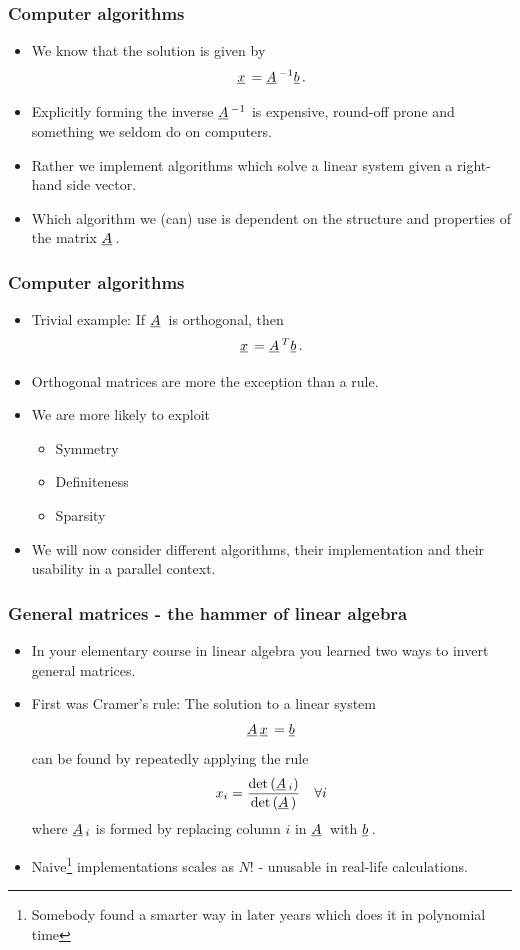 \documentclass{beamer}
\newcommand{\ub}[1]{\underbar{$#1$}\,}
\begin{document}
\begin{frame}\frametitle{Computer algorithms}
  \begin{itemize}
    \item We know that the solution is given by
      \[
        \ub{x} = \ub{A}^{-1}\ub{b}.
      \]
    \item Explicitly forming the inverse $\ub{A}^{-1}$ is expensive, round-off prone
        and something we seldom do on computers.
    \item Rather we implement algorithms which solve a linear system given a 
        right-hand side vector.
    \item Which algorithm we (can) use is dependent on the structure and properties of
        the matrix $\ub{A}$.
  \end{itemize}
\end{frame}
\begin{frame}\frametitle{Computer algorithms}
  \begin{itemize}
    \item Trivial example: If $\ub{A}$ is orthogonal, then
      \[
        \ub{x} = \ub{A}^T\ub{b}.
      \]
    \item Orthogonal matrices are more the exception than a rule.
    \item We are more likely to exploit
      \begin{itemize}
        \item Symmetry
        \item Definiteness
        \item Sparsity
      \end{itemize}
    \item We will now consider different algorithms, their implementation and their
      usability in a parallel context.
  \end{itemize}
\end{frame}
\begin{frame}\frametitle{General matrices - the hammer of linear algebra}
  \begin{itemize}
    \item In your elementary course in linear algebra you learned two ways to invert
      general matrices.
      \item First was Cramer's rule: The solution to a linear system
        \[
          \ub{A}\ub{x} = \ub{b}
        \]
        can be found by repeatedly applying the rule
        \[
          x_i = \frac{\det\left(\ub{A}_i\right)}{\det\left(\ub{A}\right)}\quad \forall i
        \]
        where $\ub{A}_i$ is formed by replacing column $i$ in $\ub{A}$ with $\ub{b}$.
      \item Naive\footnote{Somebody found a smarter way in later years which does it in polynomial time}
            implementations scales as $N!$ - unusable in real-life calculations.
    \end{itemize}
\end{frame}
\end{document}
